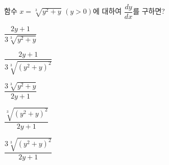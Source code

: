 함수 $x=\sqrt[3]{y^2+y}$ $(y>0)$에 대하여 $\dfrac{dy}{dx}$를 구하면?
\begin{choicesii}{\rule[-3ex]{0pt}{8ex}$\dfrac{2y+1}{3\sqrt[3]{y^2+y}}$}{\rule[-3ex]{0pt}{8ex}$\dfrac{2y+1}{3\sqrt[3]{(y^2+y)^2}}$}{\rule[-3ex]{0pt}{8ex}$\dfrac{3\sqrt[3]{y^2+y}}{2y+1}$}{\rule[-3ex]{0pt}{8ex}$\dfrac{\sqrt[3]{(y^2+y)^2}}{2y+1}$}{\rule[-3ex]{0pt}{8ex}$\dfrac{3\sqrt[3]{(y^2+y)^2}}{2y+1}$}\end{choicesii}
